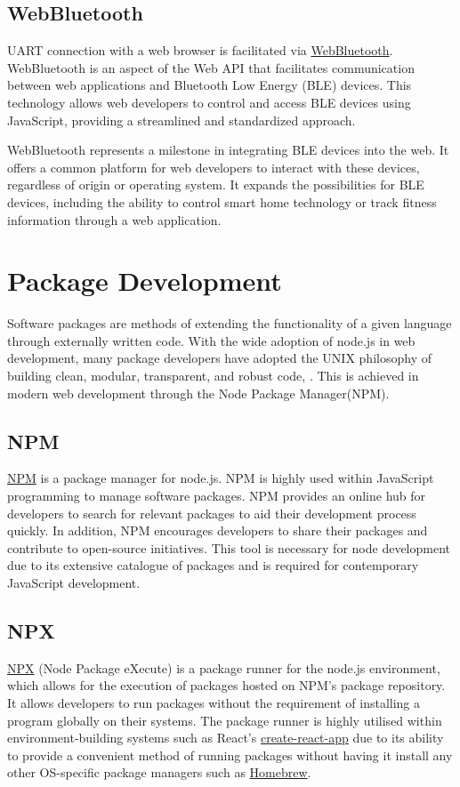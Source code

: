 \documentclass{l4proj}
\begin{document}
\subsection{WebBluetooth}
\text UART connection with a web browser is facilitated via \href{https://developer.mozilla.org/en-US/docs/Web/API/Web_Bluetooth_API}{WebBluetooth}. WebBluetooth is an aspect of the Web API that facilitates communication between web applications and Bluetooth Low Energy (BLE) devices. This technology allows web developers to control and access BLE devices using JavaScript, providing a streamlined and standardized approach.

WebBluetooth represents a milestone in integrating BLE devices into the web. It offers a common platform for web developers to interact with these devices, regardless of origin or operating system. It expands the possibilities for BLE devices, including the ability to control smart home technology or track fitness information through a web application.

\section{Package Development}

Software packages are methods of extending the functionality of a given language through externally written code. With the wide adoption of node.js in web development, many package developers have adopted the UNIX philosophy of building clean, modular, transparent, and robust code, \cite{TheArtOfUNIXProgramming}. This is achieved in modern web development through the Node Package Manager(NPM).

\subsection{NPM}
\href{https://www.npmjs.com/}{NPM} is a package manager for node.js. NPM is highly used within JavaScript programming to manage software packages. NPM provides an online hub for developers to search for relevant packages to aid their development process quickly. In addition, NPM encourages developers to share their packages and contribute to open-source initiatives. This tool is necessary for node development due to its extensive catalogue of packages and is required for contemporary JavaScript development.

\subsection{NPX}
\href{https://docs.npmjs.com/cli/v7/commands/npx}{NPX} (Node Package eXecute) is a package runner for the node.js environment, which allows for the execution of packages hosted on NPM's package repository. It allows developers to run packages without the requirement of installing a program globally on their systems. The package runner is highly utilised within environment-building systems such as React's \href{https://reactjs.org/docs/create-a-new-react-app.html}{create-react-app} due to its ability to provide a convenient method of running packages without having it install any other OS-specific package managers such as \href{https://brew.sh/}{Homebrew}.
\end{document}
